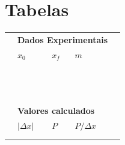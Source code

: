 \pagebreak
\section{Tabelas}

\begin{table}
\centering
\begin{tabular}{lp{25mm}p{25mm}p{25mm}l}
\toprule
	& \multicolumn{3}{l}{\textbf{Dados Experimentais}} \\
	\cmidrule{2-4}
	& $x_0$ & $x_f$ & $m$ & \\
	\cmidrule{2-4}
	& \cellcolor[gray]{0.89} & \cellcolor[gray]{0.92} & \cellcolor[gray]{0.89} \\
	& \cellcolor[gray]{0.95} & \cellcolor[gray]{0.97} & \cellcolor[gray]{0.95} \\
	& \cellcolor[gray]{0.89} & \cellcolor[gray]{0.92} & \cellcolor[gray]{0.89} \\
	& \cellcolor[gray]{0.95} & \cellcolor[gray]{0.97} & \cellcolor[gray]{0.95} \\
	& \cellcolor[gray]{0.89} & \cellcolor[gray]{0.92} & \cellcolor[gray]{0.89} \\
	& \cellcolor[gray]{0.95} & \cellcolor[gray]{0.97} & \cellcolor[gray]{0.95} \\
	& \cellcolor[gray]{0.89} & \cellcolor[gray]{0.92} & \cellcolor[gray]{0.89} \\
	& \cellcolor[gray]{0.95} & \cellcolor[gray]{0.97} & \cellcolor[gray]{0.95} \\
	& \cellcolor[gray]{0.89} & \cellcolor[gray]{0.92} & \cellcolor[gray]{0.89} \\
	& \cellcolor[gray]{0.95} & \cellcolor[gray]{0.97} & \cellcolor[gray]{0.95} \\
	& \cellcolor[gray]{0.89} & \cellcolor[gray]{0.92} & \cellcolor[gray]{0.89} \\
	& \cellcolor[gray]{0.95} & \cellcolor[gray]{0.97} & \cellcolor[gray]{0.95} \\
	\cmidrule{2-4}
\\
	& \multicolumn{3}{l}{\textbf{Valores calculados}} \\
	\cmidrule{2-4}
	& $|\Delta x|$ & $P$ & $P/\Delta x$ \\
	\cmidrule{2-4}
	& \cellcolor[gray]{0.89} & \cellcolor[gray]{0.92} & \cellcolor[gray]{0.89} \\
	& \cellcolor[gray]{0.95} & \cellcolor[gray]{0.97} & \cellcolor[gray]{0.95} \\

\end{tabular}
\end{table}
